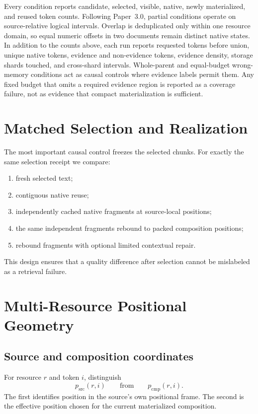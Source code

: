 \documentclass[11pt]{article}
\begin{document}
Every condition reports candidate, selected, visible, native, newly materialized, and reused token counts.
Following Paper~3.0, partial conditions operate on source-relative logical
intervals. Overlap is deduplicated only within one resource domain, so equal
numeric offsets in two documents remain distinct native states. In addition to
the counts above, each run reports requested tokens before union, unique native
tokens, evidence and non-evidence tokens, evidence density, storage shards
touched, and cross-shard intervals. Whole-parent and equal-budget wrong-memory
conditions act as causal controls where evidence labels permit them. Any fixed
budget that omits a required evidence region is reported as a coverage failure,
not as evidence that compact materialization is sufficient.

\section{Matched Selection and Realization}
\label{sec:realization}

The most important causal control freezes the selected chunks.  For exactly the same selection receipt we compare:
\begin{enumerate}[leftmargin=*]
    \item fresh selected text;
    \item contiguous native reuse;
    \item independently cached native fragments at source-local positions;
    \item the same independent fragments rebound to packed composition positions;
    \item rebound fragments with optional limited contextual repair.
\end{enumerate}

This design ensures that a quality difference after selection cannot be mislabeled as a retrieval failure.

\section{Multi-Resource Positional Geometry}

\subsection{Source and composition coordinates}
For resource $r$ and token $i$, distinguish
\[
p_{\mathrm{src}}(r,i)
\qquad\text{from}\qquad
p_{\mathrm{cmp}}(r,i).
\]
The first identifies position in the source's own positional frame.  The second is the effective position chosen for the current materialized composition.
\end{document}
